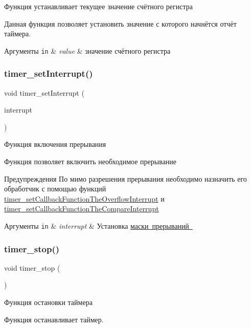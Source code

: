 Функция устанавливает текущее значение счётного регистра 

Данная функция позволяет установить значение с которого начнётся отчёт таймера. 
\begin{DoxyParams}[1]{Аргументы}
\mbox{\tt in}  & {\em value} & значение счётного регистра \\
\hline
\end{DoxyParams}
\mbox{\label{group__timer_counter_ga9eb5899834154a7367fe526f519cbb00}} 
\subsubsection{\texorpdfstring{timer\+\_\+set\+Interrupt()}{timer\_setInterrupt()}}
{\footnotesize\ttfamily void timer\+\_\+set\+Interrupt (\begin{DoxyParamCaption}\item[{\mbox{\hyperlink{group__timer_counter_ga2e7008f5da185cf8ce62fb0e5f3079ff}{T\+I\+M\+E\+R\+\_\+\+I\+N\+T\+R\+R\+U\+PT}}}]{interrupt }\end{DoxyParamCaption})}



Функция включения прерывания 

Функция позволяет включить необходимое прерывание \begin{DoxyWarning}{Предупреждения}
По мимо разрешения прерывания необходимо назначить его обработчик с помощью функций \mbox{\hyperlink{group__timer_counter_ga67dcad411b9845d922ced4c709b2698f}{timer\+\_\+set\+Callback\+Function\+The\+Overflow\+Interrupt}} и \mbox{\hyperlink{group__timer_counter_ga5df53b7b2c83f7e7c7211cb469c64998}{timer\+\_\+set\+Callback\+Function\+The\+Compare\+Interrupt}}
\end{DoxyWarning}

\begin{DoxyParams}[1]{Аргументы}
\mbox{\tt in}  & {\em interrupt} & Установка \mbox{\hyperlink{group__timer_counter_ga2e7008f5da185cf8ce62fb0e5f3079ff}{маски прерываний }} \\
\hline
\end{DoxyParams}
\mbox{\label{group__timer_counter_ga37980fc313f86d7f40a3d7643861ed29}} 
\subsubsection{\texorpdfstring{timer\+\_\+stop()}{timer\_stop()}}
{\footnotesize\ttfamily void timer\+\_\+stop (\begin{DoxyParamCaption}\item[{void}]{ }\end{DoxyParamCaption})}



Функция остановки таймера 

Функция останавливает таймер. 